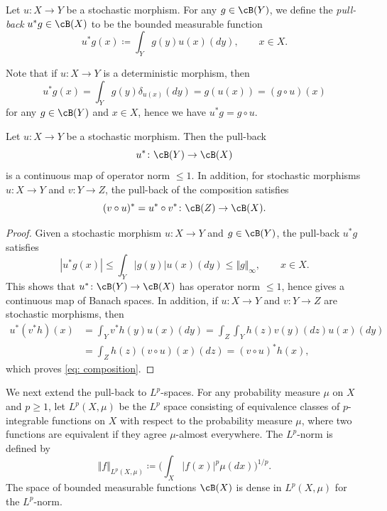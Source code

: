 \documentclass[12pt,reqno]{amsart}%
\theoremstyle{plain}
\theoremstyle{definition}
\def\abs#1{|#1|}
\def\dabs#1{\Vert#1\Vert}
\begin{document}
\begin{definition}\label{def: pullback}
	Let $u\colon X\rightarrow Y$ be a stochastic morphism.
	For any $g\in\cB(Y)$, we define the \emph{pull-back} $u^*g\in\cB(X)$
	to be the bounded measurable function
	\[
		u^*g(x)\coloneqq\int_Yg(y) u(x)(dy),\qquad x\in X.
	\]
\end{definition}

Note that if $u\colon X\rightarrow Y$ is a deterministic morphism, then
\[
	u^*g(x)=\int_Y g(y)\delta_{u(x)}(dy)=g(u(x))=(g\circ u)(x)
\]
for any $g\in\cB(Y)$ and $x\in X$, hence we have $u^* g=g\circ u$.

\begin{proposition}\label{prop: contravariant}
	Let $u\colon X\rightarrow Y$ be a stochastic morphism.
	Then the pull-back
	\[
		u^*\colon\cB(Y)\rightarrow\cB(X)
	\]
	is a continuous map of operator norm $\leq 1$.
	In addition, for stochastic morphisms $u\colon X\rightarrow Y$
	and $v\colon Y\rightarrow Z$,
	the pull-back of the composition satisfies
	\begin{equation}\label{eq: composition}
		(v\circ u)^*= u^*\circ v^*\colon\cB(Z)\rightarrow\cB(X).
	\end{equation}
\end{proposition}

\begin{proof}
	Given a stochastic morphism $u\colon X\rightarrow Y$
	and $g\in\cB(Y)$, the pull-back $u^*g$
	satisfies
	\[
		\abs{u^*g(x)}\leq\int_Y\abs{g(y)} u(x)(dy)\leq\dabs{g}_\infty,\qquad x\in X.
	\]
	This shows that $u^*\colon\cB(Y)\rightarrow\cB(X)$ has operator norm $\leq1$,
	hence gives a continuous map of Banach spaces.
	In addition, if $u\colon X\rightarrow Y$ and $v\colon Y\rightarrow Z$ are stochastic morphisms,
	then
	\begin{align*}
		u^*(v^*h)(x)&=\int_Y v^*h(y) u(x)(dy)=\int_Z\int_Y h(z) v(y)(dz)u(x)(dy)\\
		&=\int_Z h(z) (v\circ u)(x)(dz)=(v\circ u)^* h(x),
	\end{align*}
	which proves \eqref{eq: composition}.
\end{proof}

We next extend the pull-back to $L^p$-spaces.
For any probability measure $\mu$ on $X$ and $p\geq1$, let $L^p(X,\mu)$ be the $L^p$ space consisting of
equivalence classes of $p$-integrable functions on $X$ with respect to the probability measure $\mu$,
where two functions are equivalent if they agree $\mu$-almost everywhere.
The $L^p$-norm is defined by
\[
	\dabs{f}_{L^p(X,\mu)}\coloneqq\biggl(\int_X\abs{f(x)}^p\mu(dx)\biggr)^{1/p}.
\]
The space of bounded measurable functions $\cB(X)$
is dense in $L^p(X,\mu)$ for the $L^p$-norm.
\end{document}

